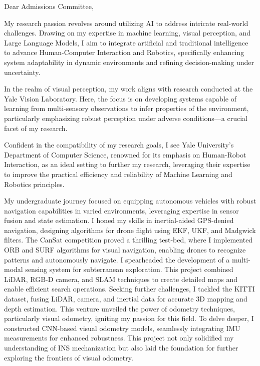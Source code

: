 \documentclass[a4,20pt]{article}
\begin{document}
\begin{large} 
Dear Admissions Committee,

My research passion revolves around utilizing AI to address intricate real-world challenges. Drawing on my expertise in machine learning, visual perception, and Large Language Models, I aim to integrate artificial and traditional intelligence to advance Human-Computer Interaction and Robotics, specifically enhancing system adaptability in dynamic environments and refining decision-making under uncertainty. 

In the realm of visual perception, my work aligns with research conducted at the Yale Vision Laboratory. Here, the focus is on developing systems capable of learning from multi-sensory observations to infer properties of the environment, particularly emphasizing robust perception under adverse conditions—a crucial facet of my research.

Confident in the compatibility of my research goals, I see Yale University's Department of Computer Science, renowned for its emphasis on Human-Robot Interaction, as an ideal setting to further my research, leveraging their expertise to improve the practical efficiency and reliability of Machine Learning and Robotics principles.

My undergraduate journey focused on equipping autonomous vehicles with robust navigation capabilities in varied environments, leveraging expertise in sensor fusion and state estimation. I honed my skills in inertial-aided GPS-denied navigation, designing algorithms for drone flight using EKF, UKF, and Madgwick filters. The CanSat competition proved a thrilling test-bed, where I implemented ORB and SURF algorithms for visual navigation, enabling drones to recognize patterns and autonomously navigate. I spearheaded the development of a multi-modal sensing system for subterranean exploration. This project combined LiDAR, RGB-D camera, and SLAM techniques to create detailed maps and enable efficient search operations. Seeking further challenges, I tackled the KITTI dataset, fusing LiDAR, camera, and inertial data for accurate 3D mapping and depth estimation. This venture unveiled the power of odometry techniques, particularly visual odometry, igniting my passion for this field. To delve deeper, I constructed CNN-based visual odometry models, seamlessly integrating IMU measurements for enhanced robustness. This project not only solidified my understanding of INS mechanization but also laid the foundation for further exploring the frontiers of visual odometry.



\end{large}
\end{document}
